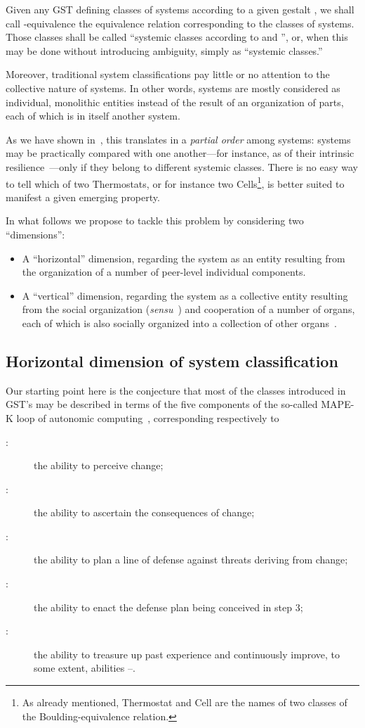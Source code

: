 \documentclass[twocolumn]{svjour3}
\def\M{\hbox{}}
\def\A{\hbox{}}
\def\P{\hbox{}}
\def\E{\hbox{}}
\def\K{\hbox{}}
\begin{document}
\begin{definition}
Given any GST  defining  classes of systems
according to a given gestalt , we shall call -equivalence the equivalence relation
corresponding to the  classes of systems. Those classes shall be called ``systemic classes according to  and '',
or, when this may be done without introducing ambiguity, simply as ``systemic classes.''
\end{definition}

Moreover, traditional system classifications pay little or no attention to the collective nature
of systems. In other words, systems are mostly considered
as individual, monolithic entities instead of the result of an organization of parts,
each of which is in itself another system.

As we have shown in~\cite{DF14b}, this translates in a \emph{partial order\/} among systems:
systems may be practically compared with one another---for instance, as of their intrinsic
resilience~\cite{DF15b}---only if they belong to different systemic classes. There is no easy
way to tell which of two Thermostats, or for instance two Cells\footnote{As already mentioned,
Thermostat and Cell are the names of two classes of the Boulding-equivalence relation.},
is better suited to manifest a given emerging property.

In what follows we propose to tackle this problem by considering two ``dimensions'':
\begin{itemize}
\item A ``horizontal'' dimension, regarding the system as an entity
resulting from the organization of a number of peer-level individual components.
\item A ``vertical'' dimension, regarding the system as a collective entity
resulting from the social organization (\emph{sensu}~\cite{Bou56}) and cooperation of a number of organs,
each of which is also socially organized into a collection of other organs~\cite{DBLP:journals/corr/Florio15c}.
\end{itemize}


\subsection{Horizontal dimension of system classification}\label{s:clas:hor}
Our starting point here is the conjecture that most of the classes introduced
in GST's may be described in terms of the five 
components of the so-called MAPE-K loop of autonomic
computing~\cite{KeCh:2003}, corresponding respectively to
\begin{description}
\item[\M:] the ability to perceive change;
\item[\A:] the ability to ascertain the consequences of change;
\item[\P:] the ability to plan a line of defense against threats deriving from change;
\item[\E:] the ability to enact the defense plan being conceived in step 3;
\item[\K:] the ability to treasure up past experience and continuously improve, to some extent, 
abilities \M--\E.
\end{description}
\end{document}

